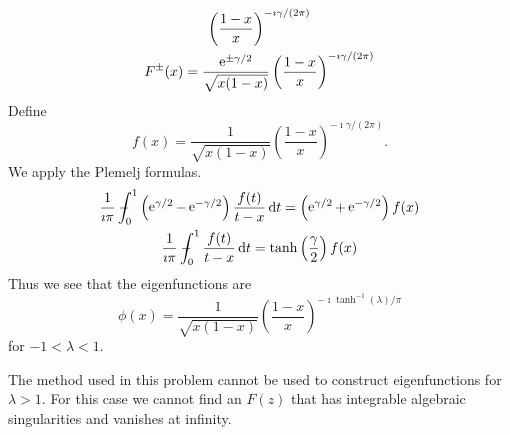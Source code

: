 \begin{Solution}
\begin{gather*}
    \left( \frac{1-x}{x} \right)^{- \imath \gamma / (2\pi)} \\
    F^\pm(x) = \frac{\mathop{\mathrm{e}}\nolimits^{\pm \gamma / 2}}{\sqrt{x(1-x)}} 
    \left( \frac{1-x}{x} \right)^{- \imath \gamma / (2\pi)} 
  \end{gather*}
  Define 
  \[
  f(x) = \frac{1}{\sqrt{x(1-x)}} 
  \left( \frac{1-x}{x} \right)^{- \imath \gamma / (2\pi)}.
  \]
  We apply the Plemelj formulas.
  \begin{gather*}
    \frac{1}{\imath \pi} \pv\int_0^1 \left( \e^{\gamma/2} - \e^{-\gamma/2} \right)
    \frac{ f(t) }{ t-x } \,\dd t 
    = \left( \e^{\gamma/2} + \e^{-\gamma/2} \right) f(x) \\
    \frac{1}{\imath \pi} \pv\int_0^1 \frac{ f(t) }{ t-x } \,\dd t 
    = \tanh \left( \frac{\gamma}{2} \right) f(x) 
  \end{gather*}
  Thus we see that the eigenfunctions are 
  \[
  \boxed{
    \phi(x) = \frac{1}{\sqrt{x(1-x)}} 
    \left( \frac{1-x}{x} \right)^{- \imath \tanh^{-1}(\lambda) / \pi}
    }
  \]
  for $-1 < \lambda < 1$.  

  The method used in this problem cannot be used to construct eigenfunctions
  for $\lambda > 1$.   For this case we cannot find an $F(z)$ that has
  integrable algebraic singularities and vanishes at infinity.
\end{Solution}



